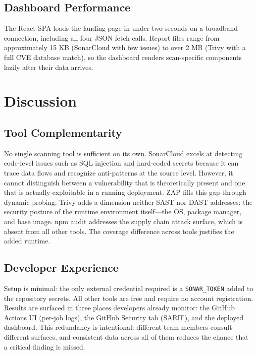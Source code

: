 \documentclass[10pt,conference]{IEEEtran}
\begin{document}
\subsection{Dashboard Performance}

The React SPA loads the landing page in under two seconds on a broadband
connection, including all four JSON fetch calls.
Report files range from approximately 15 KB (SonarCloud with few issues) to
over 2 MB (Trivy with a full CVE database match), so the dashboard renders
scan-specific components lazily after their data arrives.

\section{Discussion}

\subsection{Tool Complementarity}

No single scanning tool is sufficient on its own.
SonarCloud excels at detecting code-level issues such as SQL injection and
hard-coded secrets because it can trace data flows and recognize anti-patterns
at the source level.
However, it cannot distinguish between a vulnerability that is theoretically
present and one that is actually exploitable in a running deployment.
ZAP fills this gap through dynamic probing.
Trivy adds a dimension neither SAST nor DAST addresses: the security posture
of the runtime environment itself—the OS, package manager, and base image.
npm audit addresses the supply chain attack surface, which is absent from all
other tools.
The coverage difference across tools justifies the added runtime.

\subsection{Developer Experience}

Setup is minimal: the only external credential required is a \texttt{SONAR\_TOKEN}
added to the repository secrets.
All other tools are free and require no account registration.
Results are surfaced in three places developers already monitor: the
GitHub Actions UI (per-job logs), the GitHub Security tab (SARIF), and the
deployed dashboard.
This redundancy is intentional: different team members consult different
surfaces, and consistent data across all of them reduces the chance that a
critical finding is missed.
\end{document}
